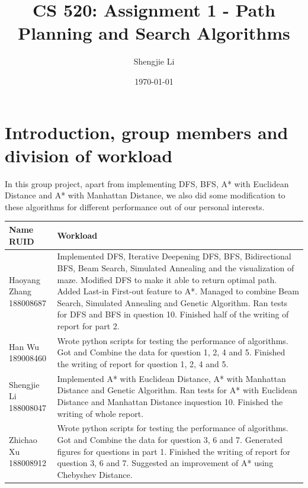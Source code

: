 \documentclass[letter]{article}
\title{CS 520: Assignment 1 - Path Planning and Search Algorithms}
\author{Shengjie Li}
\date{\today}
\begin{document}
\maketitle

\section{Introduction, group members and division of workload}
\label{sec:Introduction}

In this group project, apart from implementing DFS, BFS, A* with Euclidean Distance and A* with Manhattan Distance, we also did some modification to these algorithms for different performance out of our personal interests.  \\
\begin{tabular}{| p{2.5cm} | p{11.5cm} |}
	\hline
	\makecell[c]{Name \\ RUID} & Workload \\
	\hline
	\makecell[c]{Haoyang Zhang \\ 188008687} & {Implemented DFS, Iterative Deepening DFS, BFS, Bidirectional BFS, Beam Search, Simulated Annealing and the visualization of maze. Modified DFS to make it able to return optimal path. Added Last-in First-out feature to A*. Managed to combine Beam Search, Simulated Annealing and Genetic Algorithm. Ran tests for DFS and BFS in question 10. Finished half of the writing of report for part 2.} \\
	\hline
	\makecell[c]{Han Wu \\ 189008460} & {Wrote python scripts for testing the performance of algorithms. Got and Combine the data for question 1, 2, 4 and 5. Finished the writing of report for question 1, 2, 4 and 5.} \\
	\hline
	\makecell[c]{Shengjie Li \\ 188008047} & {Implemented A* with Euclidean Distance, A* with Manhattan Distance and Genetic Algorithm. Ran tests for A* with Euclidean Distance and Manhattan Distance inquestion 10. Finished the writing of whole report. } \\
	\hline
	\makecell[c]{Zhichao Xu \\ 188008912} & {Wrote python scripts for testing the performance of algorithms. Got and Combine the data for question 3, 6 and 7. Generated figures for questions in part 1. Finished the writing of report for question 3, 6 and 7. Suggested an improvement of A* using Chebyshev Distance.} \\
	\hline
\end{tabular}
\end{document}
